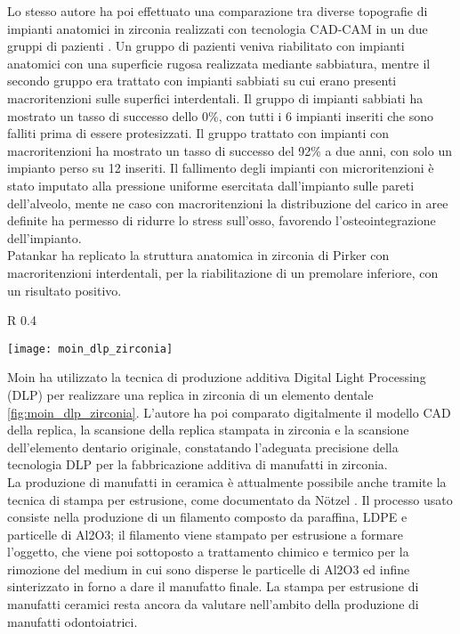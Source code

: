 Lo stesso autore ha poi effettuato una comparazione tra diverse topografie di impianti anatomici in zirconia realizzati con tecnologia CAD-CAM in un due gruppi di pazienti \parencite{Reference87}. Un gruppo di pazienti veniva riabilitato con impianti anatomici con una superficie rugosa realizzata mediante sabbiatura, mentre il secondo gruppo era trattato con impianti sabbiati su cui erano presenti macroritenzioni sulle superfici interdentali. Il gruppo di impianti sabbiati ha mostrato un tasso di successo dello 0\%, con tutti i 6 impianti inseriti che sono falliti prima di essere protesizzati. Il gruppo trattato con impianti con macroritenzioni ha mostrato un tasso di successo del 92\% a due anni, con solo un impianto perso su 12 inseriti. Il fallimento degli impianti con microritenzioni è stato imputato alla pressione uniforme esercitata dall'impianto sulle pareti dell'alveolo, mente ne caso con macroritenzioni la distribuzione del carico in aree definite ha permesso di ridurre lo stress sull'osso, favorendo l'osteointegrazione dell'impianto. \\
Patankar \parencite{Reference88} ha replicato la struttura anatomica in zirconia di Pirker con macroritenzioni interdentali, per la riabilitazione di un premolare inferiore, con un risultato positivo.\\

\begin{wrapfigure} {R} {0.4\textwidth}
\vspace{-20pt}
	\begin{center}
	\texttt{[image: moin\_dlp\_zirconia]}
    \caption{a sinistra modello CAD dell'elemento dentario. A destra modello dentario  in zirconia stampato stampato con tecnica DLP. Da \emph{Moin et al} \parencite{Reference89}}
    \label{fig:moin_dlp_zirconia}
    \end{center}
\vspace{-20pt}
\end{wrapfigure}

Moin \parencite{Reference89} ha utilizzato la tecnica di produzione additiva Digital Light Processing (DLP) per realizzare una replica in zirconia di un elemento dentale \ref{fig:moin_dlp_zirconia}. L'autore ha poi comparato digitalmente il modello CAD della replica, la scansione della replica stampata in zirconia e la scansione dell'elemento dentario originale, constatando l'adeguata precisione della tecnologia DLP per la fabbricazione additiva di manufatti in zirconia. \\
La produzione di manufatti in ceramica è attualmente possibile anche tramite la tecnica di stampa per estrusione, come documentato da Nötzel \parencite{Reference97}. Il processo usato consiste nella produzione di un filamento composto da paraffina, LDPE e particelle di Al2O3; il filamento viene stampato per estrusione a formare l'oggetto, che viene poi sottoposto a trattamento chimico e termico per la rimozione del medium in cui sono disperse le particelle di Al2O3 ed infine sinterizzato in forno a dare il manufatto finale. La stampa per estrusione di manufatti ceramici resta ancora da valutare nell'ambito della produzione di manufatti odontoiatrici. \\

